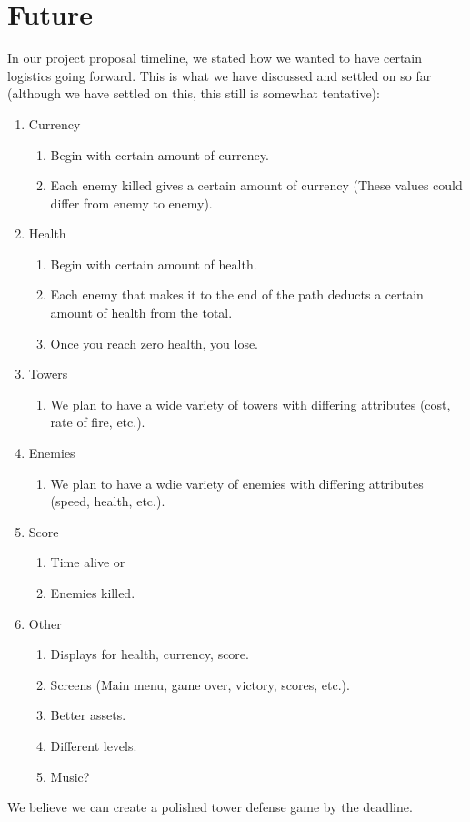 \documentclass[12pt, twoside]{article}
\begin{document}
\section*{Future}
In our project proposal timeline, we stated how we wanted to have certain logistics going forward. This is what we have discussed and settled on so far (although we have settled on this, this still is somewhat tentative):
\vfill
\pagebreak

\begin{enumerate}
    \item Currency
        \begin{enumerate}
            \item Begin with certain amount of currency.
            \item Each enemy killed gives a certain amount of currency (These values could differ from enemy to enemy).
        \end{enumerate}
    \item Health
        \begin{enumerate}
            \item Begin with certain amount of health.
            \item Each enemy that makes it to the end of the path deducts a certain amount of health from the total.
            \item Once you reach zero health, you lose.
        \end{enumerate}
    \item Towers
        \begin{enumerate}
            \item We plan to have a wide variety of towers with differing attributes (cost, rate of fire, etc.).
        \end{enumerate}
    \item Enemies
        \begin{enumerate}
            \item We plan to have a wdie variety of enemies with differing attributes (speed, health, etc.).
        \end{enumerate}
    \item Score
        \begin{enumerate}
            \item Time alive or
            \item Enemies killed.
        \end{enumerate}
    \item Other
        \begin{enumerate}
            \item Displays for health, currency, score.
            \item Screens (Main menu, game over, victory, scores, etc.).
            \item Better assets.
            \item Different levels.
            \item Music?
        \end{enumerate}
\end{enumerate}

\noindent
We believe we can create a polished tower defense game by the deadline.

 
 
\end{document}
